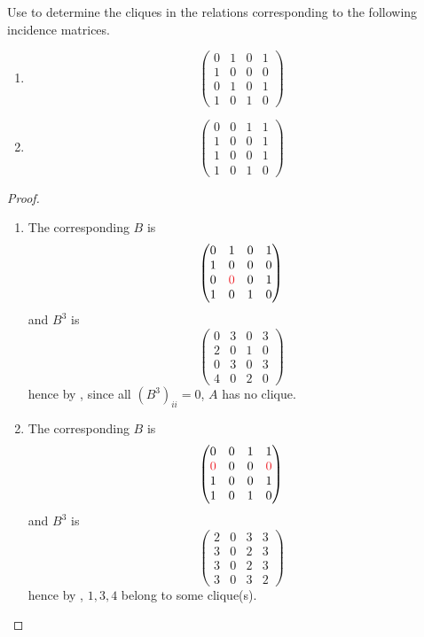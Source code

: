 \begin{exercise} \label{exercise 2.3.21}
Use  to determine the cliques in the relations corresponding to the following incidence matrices.
\begin{enumerate}
\item
\[
    \begin{pmatrix}
        0 & 1 & 0 & 1 \\
        1 & 0 & 0 & 0 \\
        0 & 1 & 0 & 1 \\
        1 & 0 & 1 & 0
    \end{pmatrix}
\]
\item
\[
    \begin{pmatrix}
        0 & 0 & 1 & 1 \\
        1 & 0 & 0 & 1 \\
        1 & 0 & 0 & 1 \\
        1 & 0 & 1 & 0
    \end{pmatrix}
\]
\end{enumerate}
\end{exercise}

\begin{proof} \ 

\begin{enumerate}
\item The corresponding \(B\) is
\[
    \begin{pmatrix}
        0 & 1 & 0 & 1 \\
        1 & 0 & 0 & 0 \\
        0 & \RED{0} & 0 & 1 \\
        1 & 0 & 1 & 0
    \end{pmatrix}
\]
and \(B^3\) is
\[
    \begin{pmatrix}
        0 & 3 & 0 & 3 \\
        2 & 0 & 1 & 0 \\
        0 & 3 & 0 & 3 \\
        4 & 0 & 2 & 0
    \end{pmatrix}
\]
hence by , since all \((B^3)_{ii} = 0\), \(A\) has no clique.

\item
The corresponding \(B\) is
\[
    \begin{pmatrix}
        0 & 0 & 1 & 1 \\
        \RED{0} & 0 & 0 & \RED{0} \\
        1 & 0 & 0 & 1 \\
        1 & 0 & 1 & 0
    \end{pmatrix}
\]
and \(B^3\) is
\[
    \begin{pmatrix}
        2 & 0 & 3 & 3 \\
        3 & 0 & 2 & 3 \\
        3 & 0 & 2 & 3 \\
        3 & 0 & 3 & 2
    \end{pmatrix}
\]
hence by , \(1, 3, 4\) belong to some clique(s).
\end{enumerate}
\end{proof}

